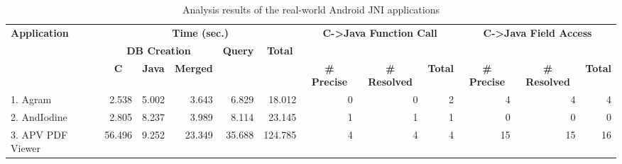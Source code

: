 \begin{table*}[t]
  \vspace{2mm}
  \caption{Analysis results of the real-world Android JNI applications}
  \label{table:RQ2}
  \vspace*{-1em}
  \centering
  \small
  \begin{tabular}{l||r|r|r|r|r||r|r|r||r|r|r}
    \multirow{3}{*}{\textbf{Application}} & \multicolumn{5}{c||}{\textbf{Time (sec.)}} & \multicolumn{3}{c||}{\multirow{2}{*}{\textbf{C->Java Function Call}}} & \multicolumn{3}{c}{\multirow{2}{*}{\textbf{C->Java Field Access}}} \\\hhline{~||-----||~~~||~~~}
    & \multicolumn{3}{c|}{\textbf{DB Creation}} & \multicolumn{1}{c|}{\multirow{2}{*}{\textbf{Query}}} & \multicolumn{1}{c||}{\multirow{2}{*}{\textbf{Total}}} & \multicolumn{3}{c||}{} & \multicolumn{3}{c}{} \\\hhline{~||---~|~||------}
    & \multicolumn{1}{c|}{\textbf{C}} & \multicolumn{1}{c|}{\textbf{Java}} & \multicolumn{1}{c|}{\textbf{Merged}} & \multicolumn{1}{c|}{} & \multicolumn{1}{c||}{} & \multicolumn{1}{c|}{\textbf{\# Precise}} & \multicolumn{1}{c|}{\textbf{\# Resolved}} & \multicolumn{1}{c||}{\textbf{Total}} & \multicolumn{1}{c|}{\textbf{\# Precise}} & \multicolumn{1}{c|}{\textbf{\# Resolved}} & \multicolumn{1}{l}{\textbf{Total}}  \\\hhline{=#*{4}{=|}=#=|=|=#=|=|=}
  1. Agram                  & 2.538                 & 5.002                    & 3.643                      & 6.829                                      & 18.012                                  & 0                           & 0                            & 2                         & 4                           & 4                            & 4                          \\
  2. AndIodine              & 2.805                 & 8.237                    & 3.989                      & 8.114                                      & 23.145                                  & 1                           & 1                            & 1                         & 0                           & 0                            & 0                          \\
  3. APV PDF Viewer         & 56.496                & 9.252                    & 23.349                     & 35.688                                     & 124.785                                 & 4                           & 4                            & 4                         & 15                          & 15                           & 16                         \\

\end{tabular}
\end{table*}
